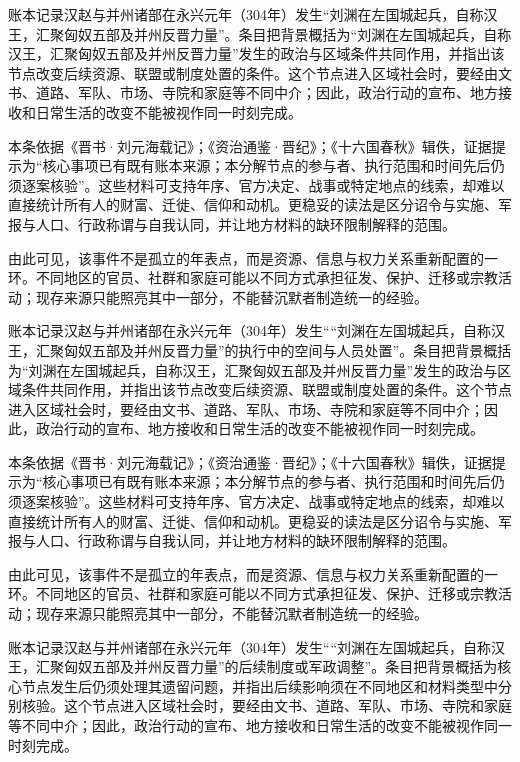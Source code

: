 账本记录汉赵与并州诸部在永兴元年（304年）发生“刘渊在左国城起兵，自称汉王，汇聚匈奴五部及并州反晋力量”。条目把背景概括为“刘渊在左国城起兵，自称汉王，汇聚匈奴五部及并州反晋力量”发生的政治与区域条件共同作用，并指出该节点改变后续资源、联盟或制度处置的条件。这个节点进入区域社会时，要经由文书、道路、军队、市场、寺院和家庭等不同中介；因此，政治行动的宣布、地方接收和日常生活的改变不能被视作同一时刻完成。

本条依据《晋书·刘元海载记》；《资治通鉴·晋纪》；《十六国春秋》辑佚，证据提示为“核心事项已有既有账本来源；本分解节点的参与者、执行范围和时间先后仍须逐案核验”。这些材料可支持年序、官方决定、战事或特定地点的线索，却难以直接统计所有人的财富、迁徙、信仰和动机。更稳妥的读法是区分诏令与实施、军报与人口、行政称谓与自我认同，并让地方材料的缺环限制解释的范围。

由此可见，该事件不是孤立的年表点，而是资源、信息与权力关系重新配置的一环。不同地区的官员、社群和家庭可能以不同方式承担征发、保护、迁移或宗教活动；现存来源只能照亮其中一部分，不能替沉默者制造统一的经验。

账本记录汉赵与并州诸部在永兴元年（304年）发生““刘渊在左国城起兵，自称汉王，汇聚匈奴五部及并州反晋力量”的执行中的空间与人员处置”。条目把背景概括为“刘渊在左国城起兵，自称汉王，汇聚匈奴五部及并州反晋力量”发生的政治与区域条件共同作用，并指出该节点改变后续资源、联盟或制度处置的条件。这个节点进入区域社会时，要经由文书、道路、军队、市场、寺院和家庭等不同中介；因此，政治行动的宣布、地方接收和日常生活的改变不能被视作同一时刻完成。

本条依据《晋书·刘元海载记》；《资治通鉴·晋纪》；《十六国春秋》辑佚，证据提示为“核心事项已有既有账本来源；本分解节点的参与者、执行范围和时间先后仍须逐案核验”。这些材料可支持年序、官方决定、战事或特定地点的线索，却难以直接统计所有人的财富、迁徙、信仰和动机。更稳妥的读法是区分诏令与实施、军报与人口、行政称谓与自我认同，并让地方材料的缺环限制解释的范围。

由此可见，该事件不是孤立的年表点，而是资源、信息与权力关系重新配置的一环。不同地区的官员、社群和家庭可能以不同方式承担征发、保护、迁移或宗教活动；现存来源只能照亮其中一部分，不能替沉默者制造统一的经验。

账本记录汉赵与并州诸部在永兴元年（304年）发生““刘渊在左国城起兵，自称汉王，汇聚匈奴五部及并州反晋力量”的后续制度或军政调整”。条目把背景概括为核心节点发生后仍须处理其遗留问题，并指出后续影响须在不同地区和材料类型中分别核验。这个节点进入区域社会时，要经由文书、道路、军队、市场、寺院和家庭等不同中介；因此，政治行动的宣布、地方接收和日常生活的改变不能被视作同一时刻完成。

